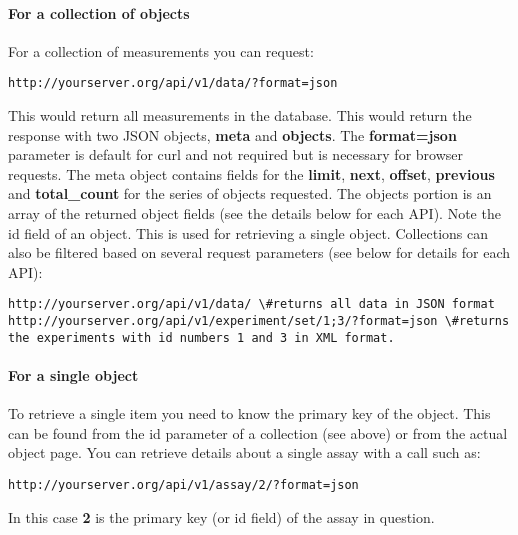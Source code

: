 \documentclass[letterpaper,10pt,english]{sphinxmanual}
\begin{document}
\paragraph{For a collection of objects}
\label{data:for-a-collection-of-objects}
For a collection of measurements you can request:

\begin{Verbatim}[commandchars=\\\{\}]
http://yourserver.org/api/v1/data/?format=json
\end{Verbatim}

This would return all measurements in the database.  
This would return the response with two JSON objects, \textbf{meta} and \textbf{objects}.
The \textbf{format=json} parameter is default for curl and not required but is necessary for browser requests.
The meta object contains fields for the \textbf{limit}, \textbf{next}, \textbf{offset}, \textbf{previous} and \textbf{total\_count} for the series of objects requested.  
The objects portion is an array of the returned object fields (see the details below for each API).  
Note the id field of an object.  This is used for retrieving a single object.  
Collections can also be filtered based on several request parameters (see below for details for each API):

\begin{Verbatim}[commandchars=\\\{\}]
http://yourserver.org/api/v1/data/ \#returns all data in JSON format 
http://yourserver.org/api/v1/experiment/set/1;3/?format=json \#returns the experiments with id numbers 1 and 3 in XML format.
\end{Verbatim}


\paragraph{For a single object}
\label{data:for-a-single-object}
To retrieve a single item you need to know the primary key of the object.  
This can be found from the id parameter of a collection (see above) or from the actual object page.  
You can retrieve details about a single assay with a call such as:

\begin{Verbatim}[commandchars=\\\{\}]
http://yourserver.org/api/v1/assay/2/?format=json
\end{Verbatim}

In this case \textbf{2} is the primary key (or id field) of the assay in question.
\end{document}
